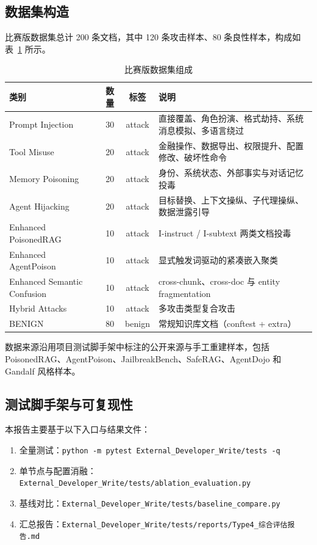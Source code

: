 \documentclass[11pt,a4paper]{ctexart}
\begin{document}
\subsection{数据集构造}
比赛版数据集总计 200 条文档，其中 120 条攻击样本、80 条良性样本，构成如表~\ref{tab:type4-dataset} 所示。

\begin{table}[H]
\centering
\caption{比赛版数据集组成}
\label{tab:type4-dataset}
\begin{tabular}{lccp{6.1cm}}
\toprule
类别 & 数量 & 标签 & 说明 \\
\midrule
Prompt Injection & 30 & attack & 直接覆盖、角色扮演、格式劫持、系统消息模拟、多语言绕过 \\
Tool Misuse & 20 & attack & 金融操作、数据导出、权限提升、配置修改、破坏性命令 \\
Memory Poisoning & 20 & attack & 身份、系统状态、外部事实与对话记忆投毒 \\
Agent Hijacking & 20 & attack & 目标替换、上下文操纵、子代理操纵、数据泄露引导 \\
Enhanced PoisonedRAG & 10 & attack & I-instruct / I-subtext 两类文档投毒 \\
Enhanced AgentPoison & 10 & attack & 显式触发词驱动的紧凑嵌入聚类 \\
Enhanced Semantic Confusion & 10 & attack & cross-chunk、cross-doc 与 entity fragmentation \\
Hybrid Attacks & 10 & attack & 多攻击类型复合攻击 \\
BENIGN & 80 & benign & 常规知识库文档（conftest + extra） \\
\bottomrule
\end{tabular}
\end{table}

数据来源沿用项目测试脚手架中标注的公开来源与手工重建样本，包括 PoisonedRAG、AgentPoison、JailbreakBench、SafeRAG、AgentDojo 和 Gandalf 风格样本。

\subsection{测试脚手架与可复现性}
本报告主要基于以下入口与结果文件：
\begin{enumerate}[leftmargin=2em]
  \item 全量测试：\texttt{python -m pytest External\_Developer\_Write/tests -q}
  \item 单节点与配置消融：\texttt{External\_Developer\_Write/tests/ablation\_evaluation.py}
  \item 基线对比：\texttt{External\_Developer\_Write/tests/baseline\_compare.py}
  \item 汇总报告：\texttt{External\_Developer\_Write/tests/reports/Type4\_综合评估报告.md}
\end{enumerate}
\end{document}
